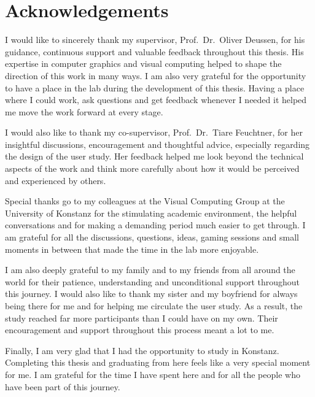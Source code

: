 \chapter*{Acknowledgements}

I would like to sincerely thank my supervisor, Prof.\ Dr.\ Oliver Deussen, for his guidance, continuous support and valuable feedback throughout this thesis. His expertise in computer graphics and visual computing helped to shape the direction of this work in many ways. I am also very grateful for the opportunity to have a place in the lab during the development of this thesis. Having a place where I could work, ask questions and get feedback whenever I needed it helped me move the work forward at every stage.

I would also like to thank my co-supervisor, Prof.\ Dr.\ Tiare Feuchtner, for her insightful discussions, encouragement and thoughtful advice, especially regarding the design of the user study. Her feedback helped me look beyond the technical aspects of the work and think more carefully about how it would be perceived and experienced by others.

Special thanks go to my colleagues at the Visual Computing Group at the University of Konstanz for the stimulating academic environment, the helpful conversations and for making a demanding period much easier to get through. I am grateful for all the discussions, questions, ideas, gaming sessions and small moments in between that made the time in the lab more enjoyable.

I am also deeply grateful to my family and to my friends from all around the world for their patience, understanding and unconditional support throughout this journey. I would also like to thank my sister and my boyfriend for always being there for me and for helping me circulate the user study. As a result, the study reached far more participants than I could have on my own. Their encouragement and support throughout this process meant a lot to me.

Finally, I am very glad that I had the opportunity to study in Konstanz. Completing this thesis and graduating from here feels like a very special moment for me. I am grateful for the time I have spent here and for all the people who have been part of this journey.

\newpage
